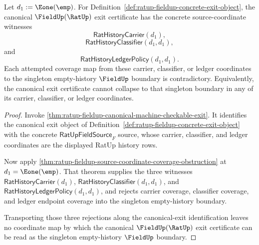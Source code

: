 \begin{theorem}
\label{thm:ratup-fieldup-canonical-exit-source-coordinate-obstruction}
Let $d_1:=\Eone(\emp)$. For
Definition~\ref{def:ratup-fieldup-concrete-exit-object}, the canonical
$\FieldUp(\RatUp)$ exit certificate has the concrete source-coordinate witnesses
$$
\mathsf{RatHistoryCarrier}(d_1),
$$
$$
\mathsf{RatHistoryClassifier}(d_1,d_1),
$$
and
$$
\mathsf{RatHistoryLedgerPolicy}(d_1,d_1).
$$
Each attempted coverage map from these carrier, classifier, or ledger
coordinates to the singleton empty-history $\FieldUp$ boundary is contradictory.
Equivalently, the canonical exit certificate cannot collapse to that singleton
boundary in any of its carrier, classifier, or ledger coordinates.
\end{theorem}
\begin{proof}
Invoke
\autoref{thm:ratup-fieldup-canonical-machine-checkable-exit}. It identifies the
canonical exit object of Definition~\ref{def:ratup-fieldup-concrete-exit-object}
with the concrete $\mathsf{RatUpFieldSource}_F$ source, whose carrier,
classifier, and ledger coordinates are the displayed RatUp history rows.

Now apply
\autoref{thm:ratup-fieldup-source-coordinate-coverage-obstruction} at
$d_1=\Eone(\emp)$. That theorem supplies the three witnesses
$\mathsf{RatHistoryCarrier}(d_1)$,
$\mathsf{RatHistoryClassifier}(d_1,d_1)$, and
$\mathsf{RatHistoryLedgerPolicy}(d_1,d_1)$, and rejects carrier coverage,
classifier coverage, and ledger endpoint coverage into the singleton
empty-history boundary.

Transporting those three rejections along the canonical-exit identification
leaves no coordinate map by which the canonical $\FieldUp(\RatUp)$ exit
certificate can be read as the singleton empty-history $\FieldUp$ boundary.
\end{proof}
